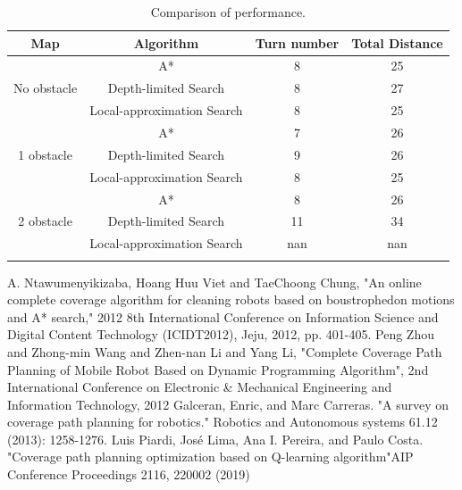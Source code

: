 \documentclass{article}
\begin{document}
\begin{normalsize}
\begin{table}[!htbp]
\centering
\caption{Comparison of performance.}
\begin{tabular}{*4c}
\toprule
Map &  Algorithm & Turn number & Total Distance\\
\midrule
\multirow{ 3}{*}{No obstacle}  & A*   &   8  & 25 \\
   &  Depth-limited Search & 8   & 27  \\
   &  Local-approximation Search & 8   & 25  \\
   \midrule
\multirow{ 3}{*}{1 obstacle}   &  A*  &  7   & 26 \\
  & Depth-limited Search & 9   & 26\\
    &  Local-approximation Search & 8   & 25  \\
    \midrule
    \multirow{ 3}{*}{2 obstacle}   &  A*  &  8   & 26 \\
  & Depth-limited Search & 11   & 34\\
    &  Local-approximation Search &  nan & nan  \\
\bottomrule
\label{comparison table}
\end{tabular}
\end{table}
            
        
    \end{normalsize}
  
  \newpage
    \begin{thebibliography}{00}
        A. Ntawumenyikizaba, Hoang Huu Viet and TaeChoong Chung, "An online complete coverage algorithm for cleaning robots based on boustrophedon motions and A* search," 2012 8th International Conference on Information Science and Digital Content Technology (ICIDT2012), Jeju, 2012, pp. 401-405.
        Peng Zhou and Zhong-min Wang and Zhen-nan Li and Yang Li, "Complete Coverage Path Planning of Mobile Robot Based on Dynamic Programming Algorithm", 2nd International Conference on Electronic \& Mechanical Engineering and Information Technology, 2012
        Galceran, Enric, and Marc Carreras. "A survey on coverage path planning for robotics." Robotics and Autonomous systems 61.12 (2013): 1258-1276.
        Luis Piardi, José Lima, Ana I. Pereira, and Paulo Costa. "Coverage path planning optimization based
        on Q-learning algorithm"AIP Conference Proceedings 2116, 220002 (2019)
        
    \end{thebibliography}
    
\end{document}
